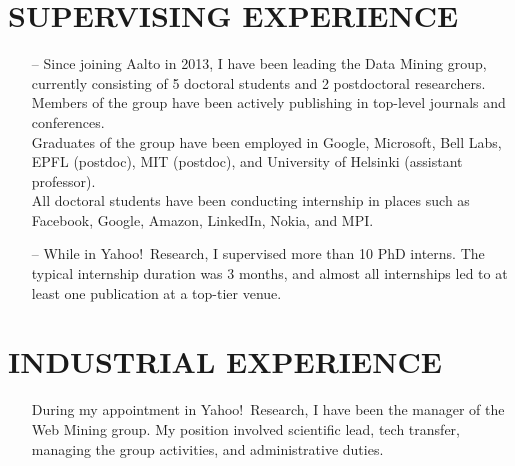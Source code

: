 \documentclass[a4paper,11pt]{res}
\begin{document}
\begin{resume}
\begin{itemize}
\end{itemize}
\fi


\section{{\small SUPERVISING EXPERIENCE}}
\begin{itemize}
\item[--]
Since joining Aalto in 2013,
I have been leading the Data Mining group, 
currently consisting of 5 doctoral students and 2 postdoctoral researchers. \\
Members of the group have been actively publishing in top-level journals and conferences.\\
Graduates of the group have been employed in Google, Microsoft, Bell Labs, 
EPFL (postdoc), MIT (postdoc), and University of Helsinki (assistant professor).\\
All doctoral students have been conducting internship in places
such as Facebook, Google, Amazon, LinkedIn, Nokia, and MPI.

\item[--]
While in Yahoo!\ Research, 
I supervised more than 10 PhD interns. 
The typical internship duration was 3 months, 
and almost all internships led to at least one publication at a top-tier venue.
\end{itemize}


\section{{\small INDUSTRIAL EXPERIENCE}}
\begin{itemize}
\item[]
During my appointment in Yahoo!\ Research, I have been the manager of the Web Mining group. 
My position involved scientific lead, 
tech transfer, 
managing the group activities, 
and administrative duties.
\end{itemize}



\end{resume}
\end{document}
